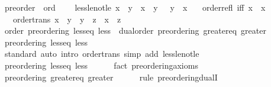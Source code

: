 \begin{isabellebody}
{\isafolddocument}%
%
\isadelimdocument
%
\endisadelimdocument
{}\isamarkupfalse%
\ preorder\ {\isacharequal}{\kern0pt}\ ord\ {\isacharplus}{\kern0pt}\isanewline
\ \ \ less{\isacharunderscore}{\kern0pt}le{\isacharunderscore}{\kern0pt}not{\isacharunderscore}{\kern0pt}le{\isacharcolon}{\kern0pt}\ {\isachardoublequoteopen}x\ {\isacharless}{\kern0pt}\ y\ {\isasymlongleftrightarrow}\ x\ {\isasymle}\ y\ {\isasymand}\ {\isasymnot}\ {\isacharparenleft}{\kern0pt}y\ {\isasymle}\ x{\isacharparenright}{\kern0pt}{\isachardoublequoteclose}\isanewline
\ \ \ order{\isacharunderscore}{\kern0pt}refl\ {\isacharbrackleft}{\kern0pt}iff{\isacharbrackright}{\kern0pt}{\isacharcolon}{\kern0pt}\ {\isachardoublequoteopen}x\ {\isasymle}\ x{\isachardoublequoteclose}\isanewline
\ \ \ order{\isacharunderscore}{\kern0pt}trans{\isacharcolon}{\kern0pt}\ {\isachardoublequoteopen}x\ {\isasymle}\ y\ {\isasymLongrightarrow}\ y\ {\isasymle}\ z\ {\isasymLongrightarrow}\ x\ {\isasymle}\ z{\isachardoublequoteclose}\isanewline
{}\isanewline
\isanewline
{}\isamarkupfalse%
\ order{\isacharcolon}{\kern0pt}\ preordering\ less{\isacharunderscore}{\kern0pt}eq\ less\ {\isacharplus}{\kern0pt}\ dual{\isacharunderscore}{\kern0pt}order{\isacharcolon}{\kern0pt}\ preordering\ greater{\isacharunderscore}{\kern0pt}eq\ greater\isanewline
%
\isadelimproof
%
\endisadelimproof
%
\isatagproof
{}\isamarkupfalse%
\ {\isacharminus}{\kern0pt}\isanewline
\ \ \isamarkupfalse%
\ preordering\ less{\isacharunderscore}{\kern0pt}eq\ less\isanewline
\ \ \ \ \isamarkupfalse%
\ standard\ {\isacharparenleft}{\kern0pt}auto\ intro{\isacharcolon}{\kern0pt}\ order{\isacharunderscore}{\kern0pt}trans\ simp\ add{\isacharcolon}{\kern0pt}\ less{\isacharunderscore}{\kern0pt}le{\isacharunderscore}{\kern0pt}not{\isacharunderscore}{\kern0pt}le{\isacharparenright}{\kern0pt}\isanewline
\ \ \isamarkupfalse%
\ {\isacartoucheopen}preordering\ less{\isacharunderscore}{\kern0pt}eq\ less{\isacartoucheclose}\isanewline
\ \ \ \ \isamarkupfalse%
\ {\isacharparenleft}{\kern0pt}fact\ preordering{\isacharunderscore}{\kern0pt}axioms{\isacharparenright}{\kern0pt}\isanewline
\ \ \isamarkupfalse%
\ \isamarkupfalse%
\ {\isacartoucheopen}preordering\ greater{\isacharunderscore}{\kern0pt}eq\ greater{\isacartoucheclose}\isanewline
\ \ \ \ \isamarkupfalse%
\ {\isacharparenleft}{\kern0pt}rule\ preordering{\isacharunderscore}{\kern0pt}dualI{\isacharparenright}{\kern0pt}\isanewline

\end{isabellebody}
